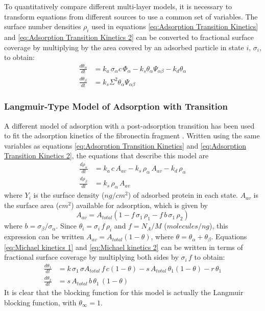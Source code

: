 To quantitatively compare different multi-layer models, it is necessary
to transform equations from different sources to use a common set
of variables. The surface number densities $\rho_{i}$ used in equations
\ref{eq:Adsorption Transition Kinetics} and \ref{eq:Adsorption Transition Kinetics 2}
can be converted to fractional surface coverage by multiplying by
the area covered by an adsorbed particle in state $i$, $\sigma_{i}$,
to obtain:\begin{align}
\frac{d\theta_{\alpha}}{dt} & =k_{a}\,\sigma_{\alpha}c\,\Phi_{\alpha}-k_{s}\theta_{\alpha}\Psi_{\alpha\beta}-k_{d}\theta_{\alpha}\label{eq:dtheta_alpha dt}\\
\frac{d\theta_{\beta}}{dt} & =k_{s}\Sigma^{2}\theta_{\alpha}\Psi_{\alpha\beta}\label{eq:dtheta_beta dt}\end{align}



\subsubsection{Langmuir-Type Model of Adsorption with Transition}

A different model of adsorption with a post-adsorption transition
has been used to fit the adsorption kinetics of the fibronectin fragment
 \cite{Michael2003}. Written using the same
variables as equations \ref{eq:Adsorption Transition Kinetics} and
\ref{eq:Adsorption Transition Kinetics 2}, the equations that describe
this model are\begin{align}
\frac{d\rho_{\alpha}}{dt} & =k_{a}\, c\, A_{av}-k_{s}\,\rho_{\alpha}\, A_{av}-k_{d}\,\rho_{\alpha}\label{eq:Michael kinetics 1}\\
\frac{d\rho_{\beta}}{dt} & =k_{s}\,\rho_{\alpha}\, A{}_{av}\label{eq:Michael kinetics 2}\end{align}
where $Y_{i}$ is the surface density ($ng/cm^{2}$) of adsorbed protein
in each state. $A_{av}$ is the surface area ($cm^{2}$) available
for adsorption, which is given by\[
A_{av}=A_{total}\left(1-f\,\sigma_{1}\,\rho_{1}-f\, b\,\sigma_{1}\,\rho_{2}\right)\]
where $b=\sigma_{\beta}/\sigma_{\alpha}$. Since $\theta_{i}=\sigma_{i}\, f\,\rho_{i}$
and $f=N_{A}/M$ ($molecules/ng$), this expression can be written
$A_{av}=A_{total}\left(1-\theta\right)$, where $\theta=\theta_{\alpha}+\theta_{\beta}$.
Equations \ref{eq:Michael kinetics 1} and \ref{eq:Michael kinetics 2}
can be written in terms of fractional surface coverage by multiplying
both sides by $\sigma_{i}\, f$ to obtain:\begin{align}
\frac{d\theta_{1}}{dt} & =k\,\sigma_{1}\,\sigma A_{total}\, f\, c\left(1-\theta\right)-s\, A_{total}\,\theta{}_{1}\left(1-\theta\right)-r\,\theta_{1}\label{eq:Langmuir two stage 1}\\
\frac{d\theta_{2}}{dt} & =s\, A_{total}\, b\,\theta_{1}\,\left(1-\theta\right)\label{eq:Langmuir two stage 2}\end{align}
It is clear that the blocking function for this model is actually
the Langmuir blocking function, with $\theta_{\infty}=1$.


